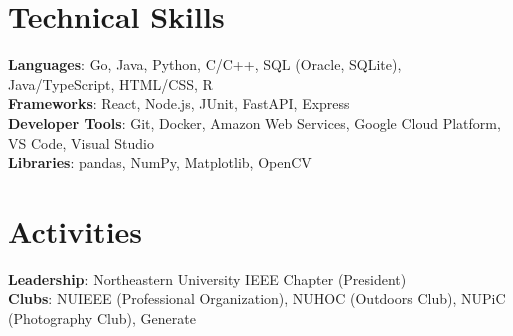 \documentclass[letterpaper,11pt]{article}
\begin{document}
%
\section{Technical Skills}
\begin{itemize}[leftmargin=0.15in, label={}]
  \small{\item{
        \textbf{Languages}{: Go, Java, Python, C/C++, SQL (Oracle, SQLite), Java/TypeScript, HTML/CSS, R} \\
        \textbf{Frameworks}{: React, Node.js, JUnit, FastAPI, Express} \\
        \textbf{Developer Tools}{: Git, Docker, Amazon Web Services, Google Cloud Platform, VS Code, Visual Studio} \\
        \textbf{Libraries}{: pandas, NumPy, Matplotlib, OpenCV}
        }}
\end{itemize}

%
\section{Activities}
\begin{itemize}[leftmargin=0.15in, label={}]
  \small{\item{
        \textbf{Leadership}{: Northeastern University IEEE Chapter (President)} \\
        \textbf{Clubs}{: NUIEEE (Professional Organization), NUHOC (Outdoors Club), NUPiC (Photography Club), Generate} \\
        }}
\end{itemize}


\end{document}
